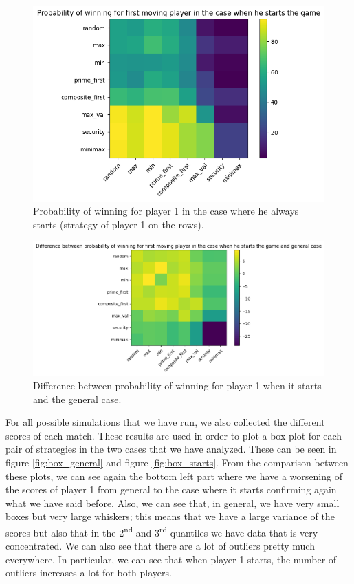 \begin{figure}
    \centering
    \includegraphics[width=0.9\linewidth]{img/prob_winning_starts.png}
    \caption{Probability of winning for player 1 in the case where he always starts (strategy of player 1 on the rows).}
    \label{fig:prob_starts}
\end{figure}

\begin{figure}
    \centering
    \includegraphics[width=0.9\linewidth]{img/diff_prob.png}
    \caption{Difference between probability of winning for player 1 when it starts and the general case.}
    \label{fig:diff_prob}
\end{figure}

For all possible simulations that we have run, we also collected the different scores of each match. These results are used in order to plot a box plot for each pair of strategies in the two cases that we have analyzed. These can be seen in figure \ref{fig:box_general} and figure \ref{fig:box_starts}.
From the comparison between these plots, we can see again the bottom left part where we have a worsening of the scores of player 1 from general to the case where it starts confirming again what we have said before. 
Also, we can see that, in general, we have very small boxes but very large whiskers; this means that we have a large variance of the scores but also that in the 2\textsuperscript{nd} and 3\textsuperscript{rd} quantiles we have data that is very concentrated. We can also see that there are a lot of outliers pretty much everywhere. In particular, we can see that when player 1 starts, the number of outliers increases a lot for both players.

